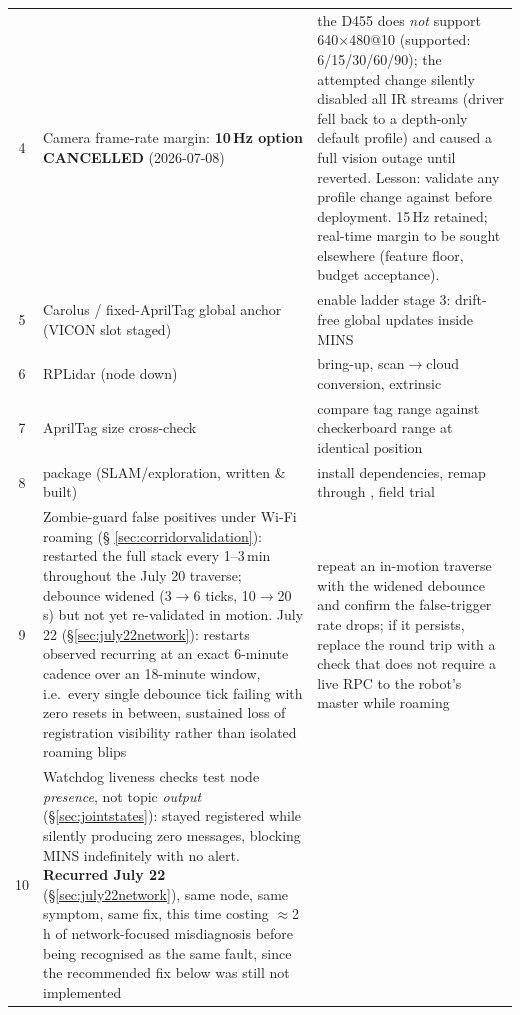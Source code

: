 \begin{longtable}{@{}cL{6.2cm}L{6.8cm}@{}}
4 & Camera frame-rate margin: \textbf{10\,Hz option CANCELLED}
    (2026-07-08) & the D455 does \emph{not} support 640$\times$480@10
    (supported: 6/15/30/60/90); the attempted change silently disabled all IR
    streams (driver fell back to a depth-only default profile) and caused a
    full vision outage until reverted. Lesson: validate any profile change
    against  before deployment. 15\,Hz retained;
    real-time margin to be sought elsewhere (feature floor, budget
    acceptance). \\
5 & Carolus / fixed-AprilTag global anchor (VICON slot staged) &
    enable ladder stage 3: drift-free global updates inside MINS \\
6 & RPLidar (node down) & bring-up, scan$\to$cloud conversion, extrinsic \\
7 & AprilTag size cross-check & compare tag range against checkerboard range
    at identical position \\
8 &  package (SLAM/exploration, written \& built) &
    install dependencies, remap  through ,
    field trial \\
9 & Zombie-guard false positives under Wi-Fi roaming (\S
    \ref{sec:corridorvalidation}):  restarted the full
    stack every 1--3\,min throughout the July 20 traverse; debounce widened
    (3$\to$6 ticks, 10$\to$20\,s) but not yet re-validated in motion.
    July 22 (\S\ref{sec:july22network}): restarts observed recurring at an
    exact 6-minute cadence over an 18-minute window, i.e.\ every single
    debounce tick failing with zero resets in between, sustained loss of
    registration visibility rather than isolated roaming blips &
    repeat an in-motion traverse with the widened debounce and confirm the
    false-trigger rate drops; if it persists, replace the  round trip with a check that does not require a live RPC to the
    robot's master while roaming \\
10 & Watchdog liveness checks test node \emph{presence}, not topic
    \emph{output} (\S\ref{sec:jointstates}): 
    stayed registered while silently producing zero 
    messages, blocking MINS indefinitely with no alert. \textbf{Recurred
    July 22} (\S\ref{sec:july22network}), same node, same symptom, same
    fix, this time costing $\approx$2\,h of network-focused misdiagnosis
    before being recognised as the same fault, since the recommended fix
    below was still not implemented &

\end{longtable}
